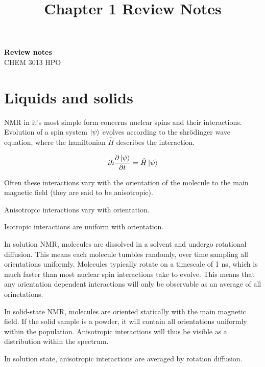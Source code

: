 \documentclass[11pt]{article}
\theoremstyle{definition}
\begin{document}
\title{Chapter 1 Review Notes}

\thispagestyle{empty}

\begin{center}
{\LARGE \bf Review notes}\\
{\large CHEM 3013 HPO}\\
\end{center}

\tableofcontents


\newpage
\section{Liquids and solids}
NMR in it's most simple form concerns nuclear spins and their interactions. Evolution of a spin system $\ket{\psi}$ evolves according to the shr\"odinger wave equation, where the hamiltonian $\hat H$ describes the interaction.

\begin{equation}
	\label{eq_wave_equation}
	i\hbar\frac{\partial\ket{\psi}}{\partial t}=\hat H\ket{\psi}
\end{equation}

Often these interactions vary with the orientation of the molecule to the main magnetic field (they are said to be anisotropic).

\begin{shaded}
		Anisotropic interactions vary with orientation.

		Isotropic interactions are uniform with orientation.
\end{shaded}

In solution NMR, molecules are dissolved in a solvent and undergo rotational diffusion. This means each molecule tumbles randomly, over time sampling all orientations uniformly. Molecules typically rotate on a timescale of 1 ns, which is much faster than most nuclear spin interactions take to evolve. This means that any orientation dependent interactions will only be observable as an average of all orinetations.

In solid-state NMR, molecules are oriented statically with the main magnetic field. If the solid sample is a powder, it will contain all orientations uniformly within the population. Anisotropic interactions will thus be visible as a distribution within the spectrum.

\begin{shaded}
	In solution state, anisotropic interactions are averaged by rotation diffusion.
\end{shaded}
\end{document}
